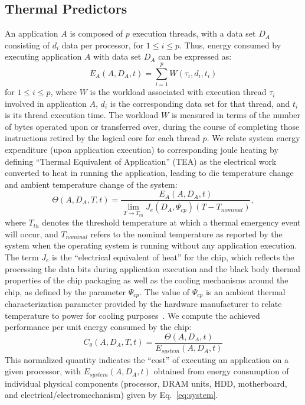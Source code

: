 \documentclass[times, 10pt,twocolumn]{IEEEtran}
\newcommand{\equationname}{Eq.}
\begin{document}
\subsection{Thermal Predictors}
\label{sec:therm-pred-design} 
An application $A$ is composed of $p$ execution threads, with a data set
$D_{A}$ consisting of $d_{i}$ data per processor, for $1\leq i \leq
p$. Thus, energy consumed by executing application $A$ with data set
$D_{A}$ can be expressed as:
\begin{equation}
\label{eq:eworkload} 
E_{A}(A,D_{A},t) = \displaystyle \sum_{i=1}^{p}W(\tau_{i},d_{i},t_{i})
\end{equation}
for $1\leq i \leq p$, where $W$ is the workload associated with
execution thread $\tau_{i}$ involved in application $A$, $d_{i}$ is the
corresponding data set for that thread, and $t_{i}$ is its thread
execution time.  The workload $W$ is measured in terms of the number of
bytes operated upon or transferred over, during the course of completing
those instructions retired by the logical core for each thread $p$. We 
relate system energy expenditure (upon application execution)
to corresponding joule heating by defining ``Thermal Equivalent of
Application'' (TEA) as the electrical work converted to heat in running
the application, leading to die temperature change and ambient
temperature change of the system:
\begin{equation}
\label{eq:tea} \Theta(A, D_{A}, T, t) =
\frac{E_{A}(A, D_{A}, t)}{\displaystyle \lim_{T \to T_{th}} J_e(D_{A}, \Psi_{cp}) (T -T_{nominal})},
\end{equation} 
where $T_{th}$ denotes the threshold temperature at which a thermal
emergency event will occur, and $T_{nominal}$ refers to the nominal
temperature as reported by the system when the operating system is
running without any application execution.  The term $J_{e}$ is the
``electrical equivalent of heat'' for the chip, which reflects the
processing the data bits during application execution and the black
body thermal properties of the chip packaging as well as the cooling
mechanisms around the chip, as defined by the parameter $\Psi_{cp}$.
The value of $\Psi_{cp}$ is an ambient thermal characterization
parameter provided by the hardware manufacturer to relate temperature to
power for cooling purposes~\cite{Intel2006}.   We compute the 
achieved performance per unit energy consumed by the
chip:
\begin{equation}
\label{eq:thermcost} 
C_{\theta}(A, D_{A}, T, t)=\frac{\Theta (A, D_{A}, t)}{E_{system}(A, D_{A}, t)}
\end{equation}
This normalized quantity indicates the ``cost'' of executing an
application on a given processor, with $E_{system}(A, D_{A}, t)$ obtained
from energy consumption of individual physical components (processor,
DRAM units, HDD, motherboard, and electrical/electromechanism) given by
\equationname\ \eqref{eq:system}.
\end{document}
